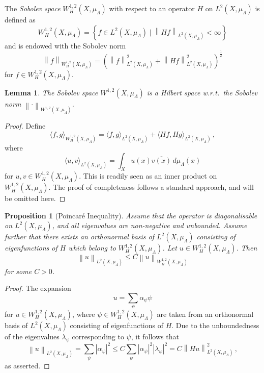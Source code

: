 \documentclass[a4paper,draft]{ZbRad}
\theoremstyle{plain}
\newtheorem{prop}{Proposition}[section]
\newtheorem{lem}{Lemma}[section]
\theoremstyle{definition}
\numberwithin{equation}{section}
\renewcommand{\le}{\leqslant}\renewcommand{\leq}{\leqslant}
\newcommand{\mathset}[1]{{\left\{#1\right\}}}
\newcommand{\absolute}[1]{\left\lvert#1\right\rvert}
\newcommand{\norm}[1]{\left\|#1\right\|}
\begin{document}
The \emph{Sobolev space} $W^{1,2}_H(X,\mu_\Lambda)$ with respect to an operator $H$ on $L^2(X,\mu_\Lambda)$ is defined as
\[
W^{1,2}_H(X,\mu_\Lambda)=\mathset{f\in L^2(X,\mu_\Lambda)\mid \norm{H f}_{L^2(X,\mu_\Lambda)}<\infty}
\]
and is endowed with the Sobolev norm
\[
\norm{f}_{W^{1,2}_H(X,\mu_\Lambda)}
=\left(
\norm{f}_{L^2(X,\mu_\Lambda)}^2+
\norm{Hf}_{L^2(X,\mu_\Lambda)}^2
\right)^{\frac12}
\]
for $f\in W^{1,2}_H(X,\mu_\Lambda)$.

\begin{lem}
The Sobolev space $W^{1,2}(X,\mu_\Lambda)$ is a Hilbert space w.r.t.\ the Sobolev norm $\norm{\cdot}_{W^{1,2}(X,\mu_\Lambda)}$.
\end{lem}

\begin{proof}
Define
\[
\langle f, g\rangle_{W^{1,2}_H(X,\mu_\Lambda)} = 
\langle f, g\rangle_{L^2(X,\mu_\Lambda)} + \langle Hf,Hg\rangle_{L^2(X,\mu_\Lambda)}\,,
\]
where
\[
\langle u, v\rangle_{L^2(X,\mu_\Lambda)}
=\int_X
u(x)\overline{v(x)}\,d\mu_\Lambda(x)
\]
for $u,v \in W^{1,2}_H(X,\mu_\Lambda)$. This is readily seen as an inner product on $W^{1,2}_H(X,\mu_\Lambda)$.
The proof of completeness follows a standard approach, and will be omitted here.
\end{proof}

\begin{prop}[Poincar\'e Inequality]\label{PoincareIneq}
Assume that the operator is diagonalisable on $L^2(X,\mu_\Lambda)$, and all eigenvalues are non-negative and unbounded. Assume further that there exists an orthonormal basis of $L^2(X,\mu_\Lambda)$ consisting of eigenfunctions of $H$ which belong to $W^{1,2}_H(X,\mu_\Lambda)$.
Let $u\in W^{1,2}_H(X,\mu_\Lambda)$. Then 
\[
\norm{u}_{L^2(X,\mu_\Lambda)}\le C\norm{u}_{W^{1,2}_H(X,\mu_\Lambda)}
\]
for some $C>0$.
\end{prop}

\begin{proof}
The expansion 
\[
u=\sum\limits_{\psi}\alpha_\psi\psi
\]
for $u\in W^{1,2}_H(X,\mu_\Lambda)$, where $\psi\in W^{1,2}_H(X,\mu_\Lambda)$ are taken from an orthonormal basis of $L^2(X,\mu_\Lambda)$ consisting of eigenfunctions of $H$. Due to the unboundedness of the eigenvalues $\lambda_\psi$ corresponding to $\psi$, it follows that
\[
\norm{u}_{L^2(X,\mu_\Lambda)}
=\sum\limits_{\psi} \absolute{\alpha_\psi}^2 \le C \sum\limits_\psi\absolute{\alpha_\psi}^2\absolute{\lambda_\psi}^2
=C\norm{H u}^2_{L^2(X,\mu_\Lambda)}\,,
\]
as asserted.
\end{proof}
\end{document}

